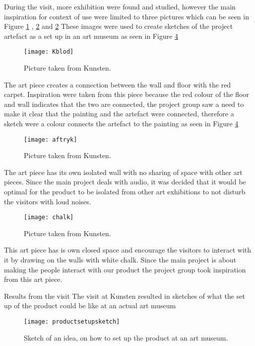 During the visit, more exhibition were found and studied, however the main inspiration for context of use were limited to three pictures which can be seen in Figure \ref{Fig:Kblod} , \ref{Fig:aftryk} and \ref{Fig:aftryk} These images were used to create sketches of the project artefact as a set up in an art museum as seen in Figure \ref{Fig:productsetupsketch}

\begin{figure}[!h] 
\centering
\texttt{[image: Kblod]}
\caption{\label{Fig:Kblod} Picture taken from Kunsten.}
\end{figure}
The art piece creates a connection between the wall and floor with the red carpet. Inspiration were taken from this piece because the red colour of the floor and wall indicates that the two are connected, the project group saw a need to make it clear that the painting and the artefact were connected, therefore a sketch were a colour connects the artefact to the painting as seen in Figure \ref{Fig:productsetupsketch}


\begin{figure}[!h] 
\centering
\texttt{[image: aftryk]}
\caption{\label{Fig:aftryk} Picture taken from Kunsten.}
\end{figure}
The art piece has its own isolated wall with no sharing of space with other art pieces. Since the main project deals with audio, it was decided that it would be optimal for the product to be isolated from other art exhibitions to not disturb the visitors with loud noises.
 
 \begin{figure}[!h] 
\centering
\texttt{[image: chalk]}
\caption{\label{Fig:chalk} Picture taken from Kunsten.}
\end{figure}
This art piece has is own closed space and encourage the visitors to interact with it by drawing on the walls with white chalk. Since the main project is about making the people interact with our product  the project group took inspiration from this art piece. 

Results from the visit
The visit at Kunsten resulted in sketches of what the set up of the product could be like at an actual art museum  
 
 \begin{figure}[!h] 
\centering
\texttt{[image: productsetupsketch]}
\caption{\label{Fig:productsetupsketch} Sketch of an idea, on how to set up the product at an art museum.}
\end{figure}
 
